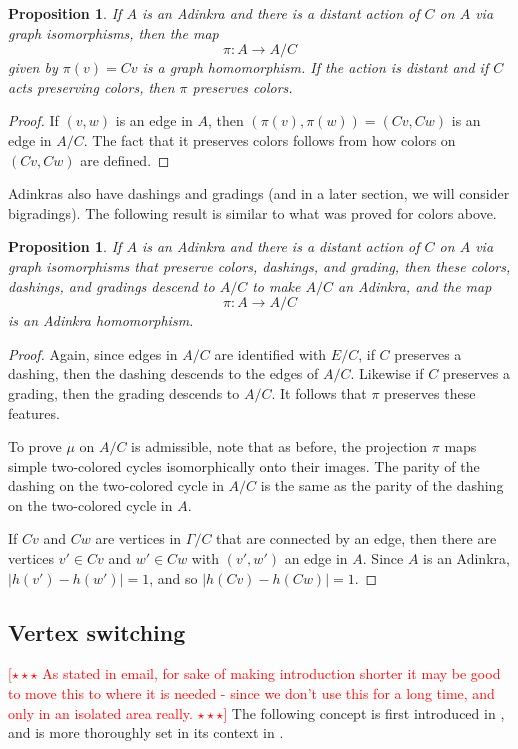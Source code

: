 \documentclass[12pt,twoside,singlespace]{article}
\numberwithin{equation}{section}
\newtheorem{prop}[equation]{Proposition}
\theoremstyle{definition}
\newcommand{\com}[1]{\textcolor{red}{$[\star \star \star$ #1 $\star \star \star]$}}
\begin{document}
\begin{prop}
If $A$ is an Adinkra and there is a distant action of $C$ on $A$ via graph isomorphisms, then the map
\[\pi:A\to A/C\]
given by $\pi(v)=Cv$ is a graph homomorphism.  If the action is distant and if $C$ acts preserving colors, then $\pi$ preserves colors.
\end{prop}
\begin{proof}
If $(v,w)$ is an edge in $A$, then $(\pi(v),\pi(w))=(Cv,Cw)$ is an edge in $A/C$.  The fact that it preserves colors follows from how colors on $(Cv,Cw)$ are defined.
\end{proof}

Adinkras also have dashings and gradings (and in a later section, we will consider bigradings).  The following result is similar to what was proved for colors above.

\begin{prop}
\label{prop:quotient2}
If $A$ is an Adinkra and there is a distant action of $C$ on $A$ via graph isomorphisms that preserve colors, dashings, and grading, then these colors, dashings, and gradings descend to $A/C$ to make $A/C$ an Adinkra, and the map
\[\pi:A\to A/C\]
is an Adinkra homomorphism.
\end{prop}
\begin{proof}
Again, since edges in $A/C$ are identified with $E/C$, if $C$ preserves a dashing, then the dashing descends to the edges of $A/C$.  Likewise if $C$ preserves a grading, then the grading descends to $A/C$.  It follows that $\pi$ preserves these features.

To prove $\mu$ on $A/C$ is admissible, note that as before, the projection $\pi$ maps simple two-colored cycles isomorphically onto their images.  The parity of the dashing on the two-colored cycle in $A/C$ is the same as the parity of the dashing on the two-colored cycle in $A$.

If $Cv$ and $Cw$ are vertices in $\Gamma/C$ that are connected by an edge, then there are vertices $v'\in Cv$ and $w'\in Cw$ with $(v',w')$ an edge in $A$.  Since $A$ is an Adinkra, $|h(v')-h(w')|=1$, and so $|h(Cv)-h(Cw)|=1$.
\end{proof}


\subsection{Vertex switching}

\com{As stated in email, for sake of making introduction shorter it may be good to move this to where it is needed - since we don't use this for a long time, and only in an isolated area really.}
The following concept is first introduced in \cite{d2l:first}, and is more thoroughly set in its context in \cite{dil:cohomology,zhang:adinkras}.
\end{document}
